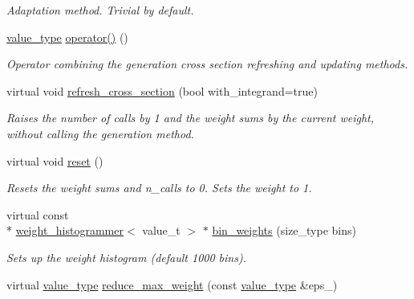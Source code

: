 \begin{DoxyCompactItemize}
\begin{DoxyCompactList}\small\item\em Adaptation method. Trivial by default. \end{DoxyCompactList}\item 
\hyperlink{a00362_a3353150105036deac9bde097cbf1d8af}{value\-\_\-type} \hyperlink{a00362_ae34c9d10ce5d16dc83b20a5179ba20ee}{operator()} ()
\begin{DoxyCompactList}\small\item\em Operator combining the generation cross section refreshing and updating methods. \end{DoxyCompactList}\item 
virtual void \hyperlink{a00362_a5d92f7676d21574ed14d82da458d7452}{refresh\-\_\-cross\-\_\-section} (bool with\-\_\-integrand=true)
\begin{DoxyCompactList}\small\item\em Raises the number of calls by 1 and the weight sums by the current weight, without calling the generation method. \end{DoxyCompactList}\item 
\hypertarget{a00362_a96247247800b9db50ddf7fafb28aca42}{virtual void \hyperlink{a00362_a96247247800b9db50ddf7fafb28aca42}{reset} ()}\label{a00362_a96247247800b9db50ddf7fafb28aca42}

\begin{DoxyCompactList}\small\item\em Resets the weight sums and n\-\_\-calls to 0. Sets the weight to 1. \end{DoxyCompactList}\item 
\hypertarget{a00362_a61c3ff75a7477c80680c1be16f03e8ca}{virtual const \\*
\hyperlink{a00576}{weight\-\_\-histogrammer}$<$ value\-\_\-t $>$ $\ast$ \hyperlink{a00362_a61c3ff75a7477c80680c1be16f03e8ca}{bin\-\_\-weights} (size\-\_\-type bins)}\label{a00362_a61c3ff75a7477c80680c1be16f03e8ca}

\begin{DoxyCompactList}\small\item\em Sets up the weight histogram (default 1000 bins). \end{DoxyCompactList}\item 
\hypertarget{a00362_a57515bec88ad50bcaa6584b788c136fb}{virtual \hyperlink{a00362_a3353150105036deac9bde097cbf1d8af}{value\-\_\-type} \hyperlink{a00362_a57515bec88ad50bcaa6584b788c136fb}{reduce\-\_\-max\-\_\-weight} (const \hyperlink{a00362_a3353150105036deac9bde097cbf1d8af}{value\-\_\-type} \&eps\-\_\-)}\label{a00362_a57515bec88ad50bcaa6584b788c136fb}


\end{DoxyCompactItemize}
